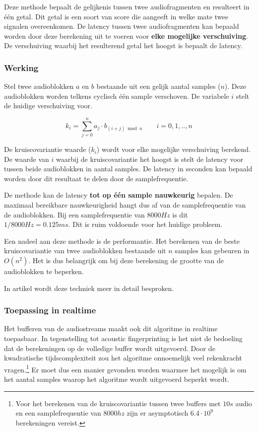 Deze methode bepaalt de gelijkenis tussen twee audiofragmenten en resulteert in één getal. Dit getal is een soort van score die aangeeft in welke mate twee signalen overeenkomen. De latency tussen twee audiofragmenten kan bepaald worden door deze berekening uit te voeren voor \textbf{elke mogelijke verschuiving}. De verschuiving waarbij het resulterend getal het hoogst is bepaalt de latency.

\subsubsection{Werking}

Stel twee audioblokken $ a $ en $ b $ bestaande uit een gelijk aantal samples ($n$). Deze audioblokken worden telkens cyclisch één sample verschoven. De variabele $ i $ stelt de huidige verschuiving voor.

\begin{equation}
	k_i = \sum_{j=0}^{n} a_{j} \cdot b_{(i+j) \bmod n} \qquad i=0,1,..,n
\end{equation}

De kruiscovariantie waarde ($ k_i $) wordt voor elke mogelijke verschuiving berekend. De waarde van $ i $ waarbij de kruiscovariantie het hoogst is stelt de latency voor tussen beide audioblokken in aantal samples. De latency in seconden kan bepaald worden door dit resultaat te delen door de samplefrequentie.

De methode kan de latency \textbf{tot op één sample nauwkeurig} bepalen. De maximaal bereikbare nauwkeurigheid hangt dus af van de samplefrequentie van de audioblokken. Bij een samplefrequentie van $8000 Hz$ is dit $ 1/8000 Hz = 0.125 ms $. Dit is ruim voldoende voor het huidige probleem.

Een nadeel aan deze methode is de performantie. Het berekenen van de beste kruiscovariantie van twee audioblokken bestaande uit $ n $ samples kan gebeuren in  $O(n^{2})$. Het is dus belangrijk om bij deze berekening de grootte van de audioblokken te beperken.

In artikel \cite{six2015multimodal} wordt deze techniek meer in detail besproken.

\subsubsection{Toepassing in realtime}

Het bufferen van de audiostreams maakt ook dit algoritme in realtime toepasbaar. In tegenstelling tot acoustic fingerprinting is het niet de bedoeling dat de berekeningen op de volledige buffer wordt uitgevoerd. Door de kwadratische tijdscomplexiteit zou het algoritme onnoemelijk veel rekenkracht vragen.\footnote{Voor het berekenen van de kruiscovariantie tussen twee buffers met $10s$ audio en een samplefrequentie van $8000hz$ zijn er asymptotisch $ 6.4 \cdot 10^9 $ berekeningen vereist.} Er moet dus een manier gevonden worden waarmee het mogelijk is om het aantal samples waarop het algoritme wordt uitgevoerd beperkt wordt.

